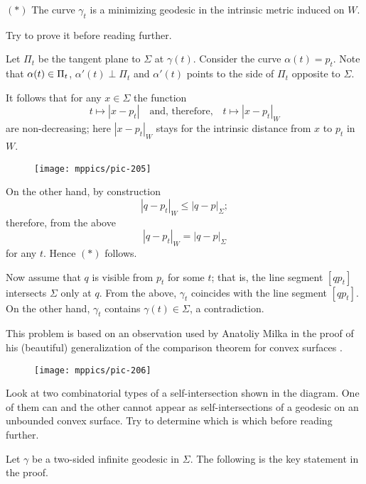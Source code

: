\begin{cl}{$({*})$} The curve $\gamma_t$ is a minimizing geodesic in the intrinsic metric induced on $W$.
\end{cl}


Try to prove it before reading further.

\medskip

Let $\Pi_t$ be the tangent plane to $\Sigma$ at $\gamma(t)$.
Consider the curve $\alpha(t)=p_t$.
Note that  
$\alpha(t)\z\in\Pi_t$,
$\alpha'(t)\perp\Pi_t$
and $\alpha'(t)$ points to the side of $\Pi_t$ opposite to $\Sigma$.



It follows that for any $x\in\Sigma$ the function  
\[t\mapsto |x - p_t|
\quad\text{and, therefore,}\quad
t\mapsto |x - p_t|_W\] are non-decreasing;
here $|x - p_t|_W$ stays for the intrinsic distance from $x$ to $p_t$ in $W$.


\begin{wrapfigure}{r}{43 mm}
\vskip-6mm
\centering
\texttt{[image: mppics/pic-205]}
\end{wrapfigure}

On the other hand, by construction 
\[|q - p_t|_W\le |q - p|_\Sigma;\] 
therefore, from the above 
\[|q - p_t|_W= |q - p|_\Sigma\]
for any $t$.
Hence $(*)$ follows.

Now assume that $q$ is visible from $p_t$ for some $t$;
that is, the line segment $[qp_t]$ intersects $\Sigma$ only at $q$.
From the above, 
$\gamma_t$  coincides with the line segment $[qp_t]$.
On the other hand, $\gamma_t$ contains $\gamma(t)\in\Sigma$, a contradiction.\qeds

This problem is based on an observation used by Anatoliy Milka in the proof of his (beautiful) generalization of the comparison theorem for convex surfaces \cite{milka-geod}.


\begin{wrapfigure}{r}{43 mm}
\vskip-0mm
\centering
\texttt{[image: mppics/pic-206]}
\end{wrapfigure}

Look at two combinatorial types of a self-intersection shown in the diagram.
One of them can and the other cannot appear as self-intersections of a geodesic on an unbounded convex surface.
Try to determine which is which before reading further.

\medskip

Let $\gamma$ be a two-sided infinite geodesic in $\Sigma$.
The following is the key statement in the proof.

